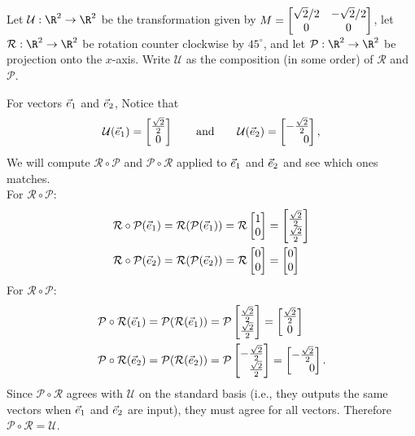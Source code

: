 \begin{example}
	Let $\mathcal U:\R^2\to\R^2$ be the transformation given by $M=\begin{bmatrix}\sqrt{2}/2&-\sqrt{2}/2\\0&0\end{bmatrix}$,
	let $\mathcal R:\R^2\to\R^2$ be rotation counter clockwise by $45^\circ$, and let $\mathcal P:\R^2\to\R^2$
	be projection onto the $x$-axis.
	Write $\mathcal U$ as the composition (in some order) of $\mathcal R$ and $\mathcal P$.

	For vectors ${\vec e_1}$ and ${\vec e_2}$, Notice that
	\[
	    \mathcal U(\xhat)=\matc{\frac{\sqrt{2}}{2}\\0}\\\qquad\text{and}\qquad \mathcal U(\yhat)=\mat{-\frac{\sqrt{2}}{2}\\0},
	\]
	We will compute $\mathcal R\circ \mathcal P$ and $\mathcal P\circ\mathcal R$ applied to ${\vec e_1}$ and ${\vec e_2}$ and see which ones matches. \\
	For $\mathcal R\circ \mathcal P$:
	\begin{align*}
	    \mathcal R\circ \mathcal P(\xhat)=\mathcal R(\mathcal P(\xhat))&=\mathcal R\mat{1\\0}=\mat{\frac{\sqrt{2}}{2}\\\frac{\sqrt{2}}{2}}\\
	    \mathcal R\circ \mathcal P(\yhat)=\mathcal R(\mathcal P(\yhat))&=\mathcal R\mat{0\\0}=\mat{0\\0}
	\end{align*}
	For $\mathcal R\circ \mathcal P$:
	\begin{align*}
	    \mathcal P\circ \mathcal R(\xhat)=\mathcal P(\mathcal R(\xhat))&=\mathcal P\mat{\frac{\sqrt{2}}{2}\\\frac{\sqrt{2}}{2}}=\matc{\frac{\sqrt{2}}{2}\\0}\\
	    \mathcal P\circ \mathcal R(\yhat)=\mathcal P(\mathcal R(\yhat))&=\mathcal P\mat{-\frac{\sqrt{2}}{2}\\\frac{\sqrt{2}}{2}}=\mat{-\frac{\sqrt{2}}{2}\\0}.
	\end{align*}
	Since $\mathcal P\circ \mathcal R$ agrees with $\mathcal U$ on the standard basis (i.e., they outputs the same vectors when ${\vec e_1}$ and ${\vec e_2}$ are input), they must agree for all vectors. Therefore $\mathcal P\circ \mathcal R=\mathcal U$.
\end{example}


